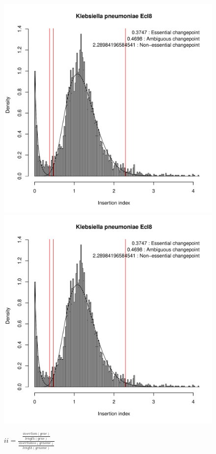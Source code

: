 \documentclass[a4paper,10pt]{article}
\begin{document}
\begin{figure}
\includegraphics[scale=0.2, page=11]{results-normalised.pdf}
\includegraphics[scale=0.2, page=12]{results-normalised.pdf}
\caption{$ii=\frac{\frac{insertion(gene)}{length(gene)}}{\frac{insertionss(genome)}{length(genome)}}$\newline
}
\end{figure}
\end{document}
